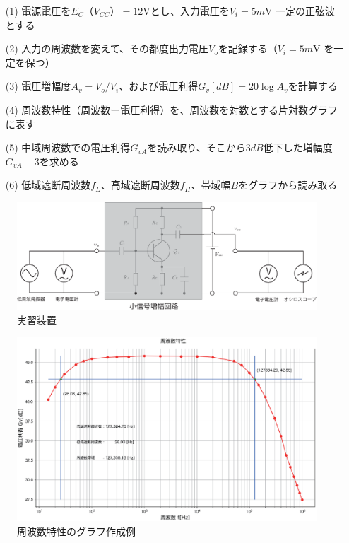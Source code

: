 \documentclass[uplatex,a4paper,11pt,oneside,openany]{jsbook}
\begin{document}
\begin{enumerate}
\item[(1)] 電源電圧を$E_C（V_{CC}）=12$Vとし、入力電圧を$V_i=5m$V 一定の正弦波とする
\item[(2)] 入力の周波数を変えて、その都度出力電圧$V_o$を記録する（$V_i=5m$V を一定を保つ）
\item[(3)] 電圧増幅度$A_v=V_o/V_i$、および電圧利得$G_v[dB]=20\log A_v$を計算する
\item[(4)] 周波数特性（周波数ー電圧利得）を、周波数を対数とする片対数グラフに表す
\item[(5)] 中域周波数での電圧利得$G_{vA}$を読み取り、そこから$3dB$低下した増幅度$G_{vA}-3$を求める
\item[(6)] 低域遮断周波数$f_L$、高域遮断周波数$f_H$、帯域幅$B$をグラフから読み取る
\end{enumerate}

\begin{figure}[H]
  \centering
   \includegraphics[keepaspectratio, scale=0.48, angle=0]
             {figs/eps/exp0.eps}
             \caption{実習装置}
             \label{fig:exp0}
\end{figure}


\begin{figure}[H]
    \centering
     \includegraphics[keepaspectratio, scale=0.55, angle=0]
               {figs/eps/freqcharM1YExample.eps}
               \caption{周波数特性のグラフ作成例}
               \label{fig:freqcharM1Yd}
\end{figure}
\end{document}
